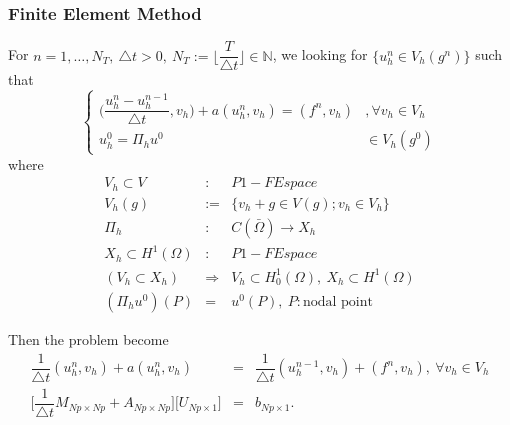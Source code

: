 \documentclass[a4paper,10pt]{article}
\begin{document}
\subsubsection{Finite Element Method}
For $ n=1, \dots, N_{T}, \ \triangle t > 0, \ N_{T} := \lfloor \dfrac{T}{\triangle t} \rfloor \in \mathbb{N} $, we looking for $ \{u_{h}^{n} \in V_{h}(g^{n}) \} $ such that
\[ \begin{cases}
\Big( \dfrac{u_{h}^{n}-u_{h}^{n-1}}{\triangle t} , v_{h} \Big) + a(u_{h}^{n}, v_{h}) = (f^{n},v_{h}) &, \forall v_{h} \in V_{h} \\
u_{h}^{0} = \Pi_{h}u^{0} &\in V_{h}(g^{0})
\end{cases} \]
where 
\begin{eqnarray} \nonumber
V_{h} \subset V &:& P1-FEspace \\ \nonumber
V_{h}(g) &:=& \{ v_{h} + g \in V(g); v_{h} \in V_{h} \} \\ \nonumber
\Pi_{h}&:& C(\bar{\Omega}) \rightarrow X_{h} \\ \nonumber
X_{h} \subset H^{1}(\Omega) &:& P1-FEspace \\ \nonumber
(V_{h} \subset X_{h}) &\Rightarrow& V_{h} \subset H_{0}^{1}(\Omega), \ X_{h} \subset H^{1}(\Omega)\\ \nonumber
(\Pi_{h} u^{0})(P) &=& u^{0}(P), \ P : \text{nodal point}
\end{eqnarray}

Then the problem become
\begin{eqnarray}\nonumber
\dfrac{1}{\triangle t} (u_{h}^{n} , v_{h}) + a(u_{h}^{n} , v_{h}) &=& \dfrac{1}{\triangle t} (u_{h}^{n-1} , v_{h}) + (f^{n},v_{h}), \ \forall v_{h} \in V_{h} \\ \nonumber
\Big[\dfrac{1}{\triangle t} M_{Np \times Np} + A_{Np \times Np}\Big]\big[U_{Np \times 1}\big] &=& b_{Np \times 1}. 
\end{eqnarray}
\newpage
\end{document}
